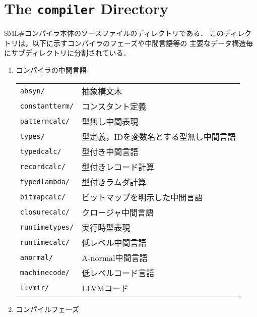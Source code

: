 \documentclass{jbook}
\newcommand{\txt}[2]{#2}
\newcommand{\smlsharp}{SML\#}
\newcommand{\code}[1]{\mbox{\large\tt #1}}
\begin{document}
\section{\txt{\code{compiler}ディレクトリ}{The \code{compiler} Directory}}
\ifjp%
	\smlsharp{}コンパイラ本体のソースファイルのディレクトリである．
	このディレクトリは，以下に示すコンパイラのフェーズや中間言語等の
主要なデータ構造毎にサブディレクトリに分割されている．
\begin{enumerate}
\item 
	コンパイラの中間言語

\begin{tabular}{ll}
\code{absyn/}& 抽象構文木
\\
\code{constantterm/}& コンスタント定義
\\
\code{patterncalc/}& 型無し中間表現
\\
\code{types/}& 型定義，IDを変数名とする型無し中間言語
\\
\code{typedcalc/}& 型付き中間言語
\\
\code{recordcalc/}& 型付きレコード計算
\\
\code{typedlambda/}& 型付きラムダ計算
\\
\code{bitmapcalc/}& ビットマップを明示した中間言語
\\
\code{closurecalc/}& クロージャ中間言語
\\
\code{runtimetypes/}& 実行時型表現
\\
\code{runtimecalc/}& 低レベル中間言語
\\
\code{anormal/}& A-normal中間言語
\\
\code{machinecode/}& 低レベルコード言語
\\
\code{llvmir/}& LLVMコード
\end{tabular}

\item コンパイルフェーズ 


\end{enumerate}
\end{document}

